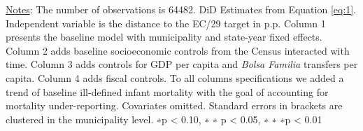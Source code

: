 \begin{table}[h!]
\begin{footnotesize}
\begin{center}
{\begin{threeparttable}[b]
    
    \begin{tablenotes}
  \scriptsize{\underline{Notes}: The number of observations is 64482. DiD Estimates from Equation \ref{eq:1}. Independent variable is the distance to the EC/29 target in p.p. Column 1 presents the baseline model with municipality and state-year fixed effects. Column 2 adds baseline socioeconomic controls from the Census interacted with time. Column 3 adds controls for GDP per capita and \emph{Bolsa Familia} transfers per capita. Column 4 adds fiscal controls. To all columns specifications we added  a trend of baseline ill-defined infant mortality with the goal of accounting for mortality under-reporting. Covariates omitted. Standard errors in brackets are clustered in the municipality level. ∗p < 0.10, ∗ ∗ p < 0.05, ∗ ∗ ∗p < 0.01}
  \end{tablenotes}
    
    
  \label{table:imr}%

\end{threeparttable}
}
\end{center}
\end{footnotesize}
\end{table}